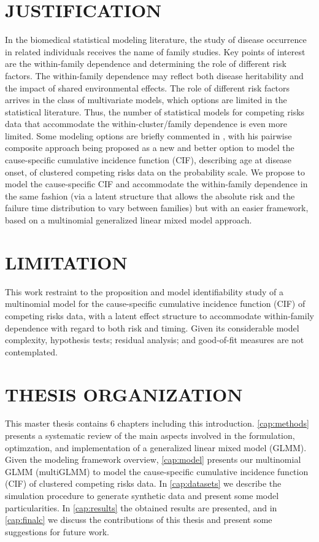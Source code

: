 \section{JUSTIFICATION}

In the biomedical statistical modeling literature, the study of disease
occurrence in related individuals receives the name of family studies.
Key points of interest are the within-family dependence and determining
the role of different risk factors. The within-family dependence may
reflect both disease heritability and the impact of shared environmental
effects. The role of different risk factors arrives in the class of
multivariate models, which options are limited in the statistical
literature. Thus, the number of statistical models for competing risks
data that accommodate the within-cluster/family dependence is even more
limited. Some modeling options are briefly commented in
, with his pairwise composite approach being
proposed as a new and better option to model the cause-specific
cumulative incidence function (CIF), describing age at disease onset, of
clustered competing risks data on the probability scale. We propose to
model the cause-specific CIF and accommodate the within-family
dependence in the same fashion (via a latent structure that allows the
absolute risk and the failure time distribution to vary between
families) but with an easier framework, based on a multinomial
generalized linear mixed model approach.

\section{LIMITATION}

This work restraint to the proposition and model identifiability study
of a multinomial model for the cause-specific cumulative incidence
function (CIF) of competing risks data, with a latent effect structure
to accommodate within-family dependence with regard to both risk and
timing. Given its considerable model complexity, hypothesis tests;
residual analysis; and good-of-fit measures are not contemplated.

\section{THESIS ORGANIZATION}

This master thesis contains 6 chapters including this introduction.
\autoref{cap:methods} presents a systematic review of the main aspects
involved in the formulation, optimzation, and implementation of a
generalized linear mixed model (GLMM). Given the modeling framework
overview, \autoref{cap:model} presents our multinomial GLMM (multiGLMM)
to model the cause-specific cumulative incidence function (CIF) of
clustered competing risks data. In \autoref{cap:datasets} we describe
the simulation procedure to generate synthetic data and present some
model particularities. In \autoref{cap:results} the obtained results are
presented, and in \autoref{cap:finalc} we discuss the contributions of
this thesis and present some suggestions for future work.

